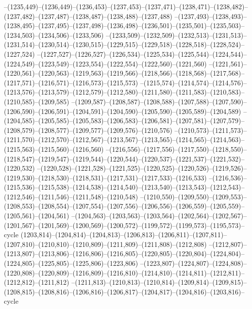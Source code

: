 --(1235,449)--(1236,449)--(1236,453)--(1237,453)--(1237,471)--(1238,471)--(1238,482)--(1237,482)--(1237,487)--(1238,487)--(1238,488)--(1237,488)
--(1237,493)--(1238,493)--(1238,495)--(1237,495)--(1237,498)--(1236,498)--(1236,501)--(1235,501)--(1235,503)--(1234,503)--(1234,506)--(1233,506)
--(1233,509)--(1232,509)--(1232,513)--(1231,513)--(1231,514)--(1230,514)--(1230,515)--(1229,515)--(1229,518)--(1228,518)--(1228,524)--(1227,524)
--(1227,527)--(1226,527)--(1226,534)--(1225,534)--(1225,544)--(1224,544)--(1224,549)--(1223,549)--(1223,554)--(1222,554)--(1222,560)--(1221,560)
--(1221,561)--(1220,561)--(1220,563)--(1219,563)--(1219,566)--(1218,566)--(1218,568)--(1217,568)--(1217,571)--(1216,571)--(1216,573)--(1215,573)
--(1215,574)--(1214,574)--(1214,576)--(1213,576)--(1213,579)--(1212,579)--(1212,580)--(1211,580)--(1211,583)--(1210,583)--(1210,585)--(1209,585)
--(1209,587)--(1208,587)--(1208,588)--(1207,588)--(1207,590)--(1206,590)--(1206,591)--(1204,591)--(1204,590)--(1205,590)--(1205,589)--(1204,589)
--(1204,585)--(1205,585)--(1205,583)--(1206,583)--(1206,581)--(1207,581)--(1207,579)--(1208,579)--(1208,577)--(1209,577)--(1209,576)--(1210,576)
--(1210,573)--(1211,573)--(1211,570)--(1212,570)--(1212,567)--(1213,567)--(1213,565)--(1214,565)--(1214,563)--(1215,563)--(1215,560)--(1216,560)
--(1216,556)--(1217,556)--(1217,550)--(1218,550)--(1218,547)--(1219,547)--(1219,544)--(1220,544)--(1220,537)--(1221,537)--(1221,532)--(1220,532)
--(1220,528)--(1221,528)--(1221,525)--(1220,525)--(1220,526)--(1219,526)--(1219,530)--(1218,530)--(1218,531)--(1217,531)--(1217,533)--(1216,533)
--(1216,536)--(1215,536)--(1215,538)--(1214,538)--(1214,540)--(1213,540)--(1213,543)--(1212,543)--(1212,546)--(1211,546)--(1211,548)--(1210,548)
--(1210,550)--(1209,550)--(1209,553)--(1208,553)--(1208,554)--(1207,554)--(1207,556)--(1206,556)--(1206,559)--(1205,559)--(1205,561)--(1204,561)
--(1204,563)--(1203,563)--(1203,564)--(1202,564)--(1202,567)--(1201,567)--(1201,569)--(1200,569)--(1200,572)--(1199,572)--(1199,573)--(1195,573)--cycle
(1203,814)--(1204,814)--(1204,813)--(1206,813)--(1206,811)--(1207,811)--(1207,810)--(1210,810)--(1210,809)--(1211,809)--(1211,808)--(1212,808)
--(1212,807)--(1213,807)--(1213,806)--(1216,806)--(1216,805)--(1220,805)--(1220,804)--(1224,804)--(1224,805)--(1225,805)--(1225,806)--(1223,806)
--(1223,807)--(1224,807)--(1224,808)--(1220,808)--(1220,809)--(1216,809)--(1216,810)--(1214,810)--(1214,811)--(1212,811)--(1212,812)--(1211,812)
--(1211,813)--(1210,813)--(1210,814)--(1209,814)--(1209,815)--(1208,815)--(1208,816)--(1206,816)--(1206,817)--(1204,817)--(1204,816)--(1203,816)--cycle
